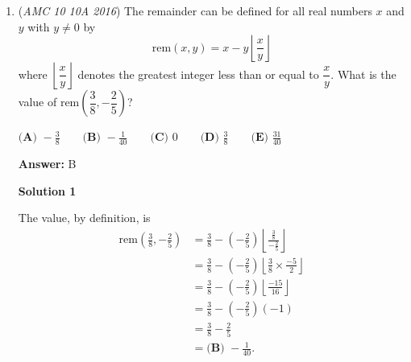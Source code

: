 \begin{enumerate}
 $\textbf{(A)}\ \$37.50 \qquad\textbf{(B)}\ \$50.00\qquad\textbf{(C)}\ \$87.50\qquad\textbf{(D)}\ \$90.00\qquad\textbf{(E)}\ \$92.50$

 \textbf{Answer: }C



\textbf{Solution 1}

If Ben paid $\$ 12.50$ more than David, then he paid $\frac{12.5}{.25}= \$ 50.00$. Thus, David paid $\$ 37.50$, and they spent $50.00+37.50 =\$ 87.50 \implies \boxed{\textbf{(C) }\$ 87.50}$.

 



\textbf{Solution 2}

If for every dollar Ben spent on bagels David spent $25$ cents less, then the ratio of the money that Ben spent to David spent is $4:3$. We know that Ben paid $\$12.50$ more than David, so we can write $\$12.50\cdot (4+3)=\$ 87.50.$ Then the answer is $\boxed{\text{(C)}}.$
\begin{verbatim}
\href{https://youtu.be/huMBaF16tlM}{https://youtu.be/huMBaF16tlM}
\end{verbatim}





	\item (\textit{AMC 10 10A 2016}) The remainder can be defined for all real numbers $x$ and $y$ with $y \neq 0$ by 
 \[\text{rem} (x ,y)=x-y\left \lfloor \frac{x}{y} \right \rfloor\]where $\left \lfloor \dfrac{x}{y} \right \rfloor$ denotes the greatest integer less than or equal to $\dfrac{x}{y}$. What is the value of $\text{rem}\left(\dfrac{3}{8}, -\dfrac{2}{5}\right)$?


 $\textbf{(A) } -\frac{3}{8} \qquad \textbf{(B) } -\frac{1}{40} \qquad \textbf{(C) } 0 \qquad \textbf{(D) } \frac{3}{8} \qquad \textbf{(E) } \frac{31}{40}$

 \textbf{Answer: }B



\textbf{Solution 1}

The value, by definition, is 
 \begin{align*} \text{rem}\left(\frac{3}{8},-\frac{2}{5}\right) &= \frac{3}{8}-\left(-\frac{2}{5}\right)\left\lfloor\frac{\frac{3}{8}}{-\frac{2}{5}}\right\rfloor \\ &= \frac{3}{8}-\left(-\frac{2}{5}\right)\left\lfloor\frac{3}{8}\times\frac{-5}{2}\right\rfloor \\ &= \frac{3}{8}-\left(-\frac{2}{5}\right)\left\lfloor\frac{-15}{16}\right\rfloor\\ &= \frac{3}{8}-\left(-\frac{2}{5}\right)\left(-1\right)\\ &= \frac{3}{8}-\frac{2}{5}\\ &= \boxed{\textbf{(B) } -\frac{1}{40}}. \end{align*}






\end{enumerate}
